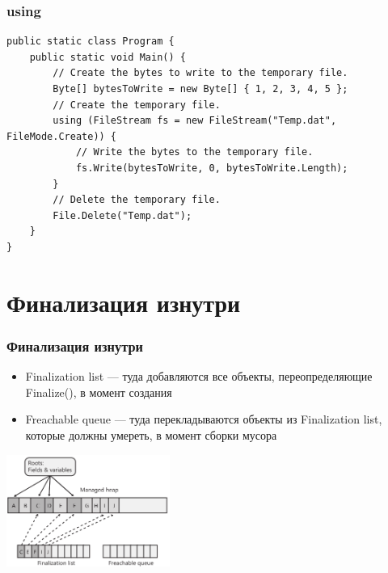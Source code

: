 \documentclass[xetex,mathserif,serif]{beamer}
\begin{document}
	\begin{frame}[fragile]
		\frametitle{using}
		\begin{scriptsize}
			\begin{verbatim}
public static class Program {
    public static void Main() {
        // Create the bytes to write to the temporary file.
        Byte[] bytesToWrite = new Byte[] { 1, 2, 3, 4, 5 };
        // Create the temporary file.
        using (FileStream fs = new FileStream("Temp.dat", FileMode.Create)) {
            // Write the bytes to the temporary file.
            fs.Write(bytesToWrite, 0, bytesToWrite.Length);
        }
        // Delete the temporary file.
        File.Delete("Temp.dat");
    }
}
			\end{verbatim}
		\end{scriptsize}
	\end{frame}

	\section{Финализация изнутри}

	\begin{frame}
		\frametitle{Финализация изнутри}
		\begin{itemize}
			\item Finalization list --- туда добавляются все объекты, переопределяющие Finalize(), в момент создания
			\item Freachable queue --- туда перекладываются объекты из Finalization list, которые должны умереть, в момент сборки мусора
		\end{itemize}
		\begin{center}
			\includegraphics[width=0.4\textwidth]{finalizationList.png}
		\end{center}
	\end{frame}
\end{document}
